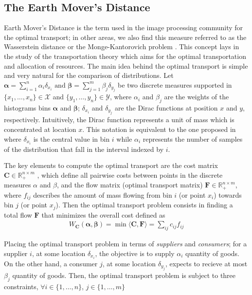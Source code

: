 \subsection{The Earth Mover's Distance}\label{subsec:EMD}
Earth Mover's Distance is the term used in the image processing community for the optimal transport; in other areas, we also find this measure referred to as the Wasserstein distance \citep{Gibbs.Su:ISR:2002} or the Monge-Kantorovich problem \citep{Bogachev.Kolesnikov:RMS:2012, Kantorovich:JMS:2006}. This concept lays in the study of the transportation theory which aims for the optimal transportation and allocation of resources. 
The main idea behind the optimal transport is simple and very natural for the comparison of distributions. Let
$
\boldsymbol{\alpha} = \sum_{i=1}^{n}\alpha_{i}\delta_{x_i} \text{  and  } \boldsymbol{\beta} = \sum_{j=1}^{m}\beta_{j}\delta_{y_j}
$
be two discrete measures supported in $\{x_1, \ldots, x_n\} \in \mathcal{X}$ and $\{y_1, \ldots, y_n\} \in \mathcal{Y}$, where $\alpha_i$ and $\beta_j$ are the weights of the histograms bins $\boldsymbol{\alpha}$ and $\boldsymbol{\beta}$; $\delta_{x_i}$ and $\delta_{y_j}$ are the Dirac functions at position $x$ and $y$, respectively. Intuitively, the Dirac function represents a unit of mass which is concentrated at location $x$. This notation is equivalent to the one proposed in \citep{Rubner.Tomasi.ea:IJCV:2000} where $\delta_{x_i}$ is the central value in bin $i$ while $\alpha_i$ represents the number of samples of the distribution that fall in the interval indexed by $i$.

The key elements to compute the optimal transport are the cost matrix $\mathbf{C} \in \mathbb{R}^{n\times m}_+$ , which define all pairwise costs between points in the discrete measures $\alpha$ and $\beta$, and the flow matrix (optimal transport matrix) $\mathbf{F} \in \mathbb{R}^{n\times m}_+$, where $f_{ij}$ describes the amount of mass flowing from bin $i$ (or point $x_i$) towards bin $j$ (or point $x_j$). Then the optimal transport problem consists in finding a total flow $\mathbf{F}$ that minimizes the overall cost defined as
\begin{eqnarray}
W_{\mathbf{C}}(\boldsymbol{\alpha}, \boldsymbol{\beta}) = \min \langle\mathbf{C},\mathbf{F}\rangle = \sum\nolimits_{ij} c_{ij}f_{ij}
\label{eq:optimal_work}
\end{eqnarray}

Placing the optimal transport problem in terms of \textit{suppliers} and \textit{consumers}; for a supplier $i$, at some location $\delta_{x_i}$, the objective is to supply $\alpha_i$ quantity of goods. On the other hand, a consumer $j$, at some location $\delta_{y_j}$, expects to recieve at most $\beta_j$ quantity of goods. Then, the optimal transport problem is subject to three constraints, $\forall i \in\{1, \ldots, n\}$, $j \in\{1, \ldots, m\}$

